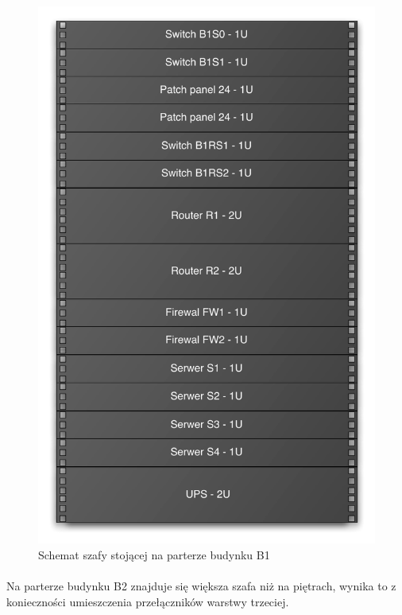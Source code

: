 \begin{figure}[H]
  \begin{center}
    \includegraphics[width=\textwidth]{img/s/szafa-b1.pdf}
    \caption{Schemat szafy stojącej na parterze budynku B1}
  \end{center}
\end{figure}

\paragraph{}
Na parterze budynku B2 znajduje się większa szafa niż na piętrach, wynika to z konieczności umieszczenia przełączników warstwy trzeciej.

